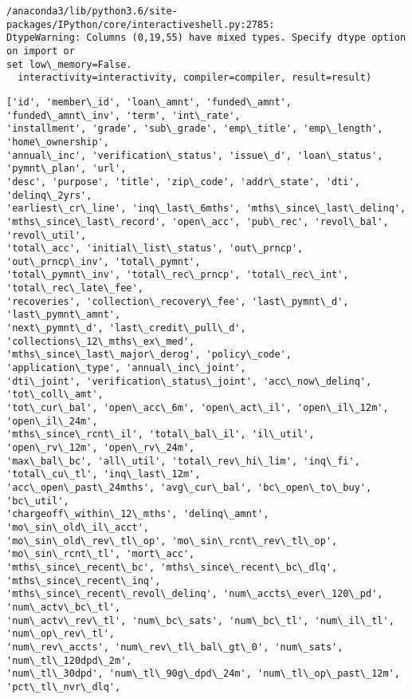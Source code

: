 \documentclass[11pt]{article}
\begin{document}
    \begin{Verbatim}[commandchars=\\\{\},fontsize=\footnotesize]
/anaconda3/lib/python3.6/site-packages/IPython/core/interactiveshell.py:2785:
DtypeWarning: Columns (0,19,55) have mixed types. Specify dtype option on import or
set low\_memory=False.
  interactivity=interactivity, compiler=compiler, result=result)

    \end{Verbatim}

    \begin{Verbatim}[commandchars=\\\{\},fontsize=\footnotesize]
['id', 'member\_id', 'loan\_amnt', 'funded\_amnt', 'funded\_amnt\_inv', 'term', 'int\_rate',
'installment', 'grade', 'sub\_grade', 'emp\_title', 'emp\_length', 'home\_ownership',
'annual\_inc', 'verification\_status', 'issue\_d', 'loan\_status', 'pymnt\_plan', 'url',
'desc', 'purpose', 'title', 'zip\_code', 'addr\_state', 'dti', 'delinq\_2yrs',
'earliest\_cr\_line', 'inq\_last\_6mths', 'mths\_since\_last\_delinq',
'mths\_since\_last\_record', 'open\_acc', 'pub\_rec', 'revol\_bal', 'revol\_util',
'total\_acc', 'initial\_list\_status', 'out\_prncp', 'out\_prncp\_inv', 'total\_pymnt',
'total\_pymnt\_inv', 'total\_rec\_prncp', 'total\_rec\_int', 'total\_rec\_late\_fee',
'recoveries', 'collection\_recovery\_fee', 'last\_pymnt\_d', 'last\_pymnt\_amnt',
'next\_pymnt\_d', 'last\_credit\_pull\_d', 'collections\_12\_mths\_ex\_med',
'mths\_since\_last\_major\_derog', 'policy\_code', 'application\_type', 'annual\_inc\_joint',
'dti\_joint', 'verification\_status\_joint', 'acc\_now\_delinq', 'tot\_coll\_amt',
'tot\_cur\_bal', 'open\_acc\_6m', 'open\_act\_il', 'open\_il\_12m', 'open\_il\_24m',
'mths\_since\_rcnt\_il', 'total\_bal\_il', 'il\_util', 'open\_rv\_12m', 'open\_rv\_24m',
'max\_bal\_bc', 'all\_util', 'total\_rev\_hi\_lim', 'inq\_fi', 'total\_cu\_tl', 'inq\_last\_12m',
'acc\_open\_past\_24mths', 'avg\_cur\_bal', 'bc\_open\_to\_buy', 'bc\_util',
'chargeoff\_within\_12\_mths', 'delinq\_amnt', 'mo\_sin\_old\_il\_acct',
'mo\_sin\_old\_rev\_tl\_op', 'mo\_sin\_rcnt\_rev\_tl\_op', 'mo\_sin\_rcnt\_tl', 'mort\_acc',
'mths\_since\_recent\_bc', 'mths\_since\_recent\_bc\_dlq', 'mths\_since\_recent\_inq',
'mths\_since\_recent\_revol\_delinq', 'num\_accts\_ever\_120\_pd', 'num\_actv\_bc\_tl',
'num\_actv\_rev\_tl', 'num\_bc\_sats', 'num\_bc\_tl', 'num\_il\_tl', 'num\_op\_rev\_tl',
'num\_rev\_accts', 'num\_rev\_tl\_bal\_gt\_0', 'num\_sats', 'num\_tl\_120dpd\_2m',
'num\_tl\_30dpd', 'num\_tl\_90g\_dpd\_24m', 'num\_tl\_op\_past\_12m', 'pct\_tl\_nvr\_dlq',

\end{Verbatim}
\end{document}
